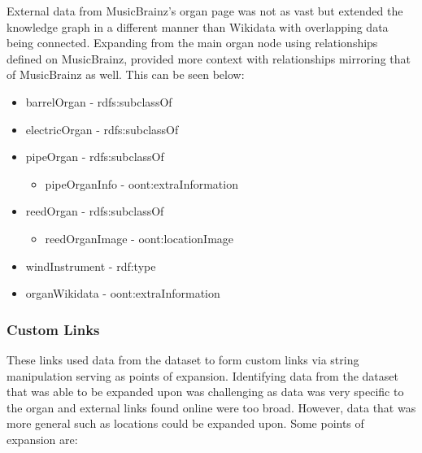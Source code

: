 External data from MusicBrainz's organ page \cite{organmusicbrainz} was not as vast but extended the knowledge graph in a different manner than Wikidata with overlapping data being connected. Expanding from the main organ node using relationships defined on MusicBrainz, provided more context with relationships mirroring that of MusicBrainz as well. This can be seen below:

\vspace{-0.15cm}
\begin{itemize}
    \itemsep0em 
    \item barrelOrgan - rdfs:subclassOf
           \vspace{-0.025cm}
    \item electricOrgan - rdfs:subclassOf
           \vspace{-0.025cm}
    \item pipeOrgan - rdfs:subclassOf
    \begin{itemize}
        \itemsep0em 
        \vspace{-0.2cm}
        \item pipeOrganInfo - oont:extraInformation
        \vspace{-0.2cm}
    \end{itemize}
    \item reedOrgan - rdfs:subclassOf
    \begin{itemize}
        \itemsep0em 
        \vspace{-0.2cm}
        \item reedOrganImage - oont:locationImage
        \vspace{-0.2cm}
    \end{itemize}
    \item windInstrument - rdf:type
           \vspace{-0.025cm}
    \item organWikidata - oont:extraInformation
\end{itemize}

\subsubsection{Custom Links}
\hspace*{0.5cm} These links used data from the dataset to form custom links via string manipulation serving as points of expansion. Identifying data from the dataset that was able to be expanded upon was challenging as data was very specific to the organ and external links found online were too broad. However, data that was more general such as locations could be expanded upon. Some points of expansion are:

